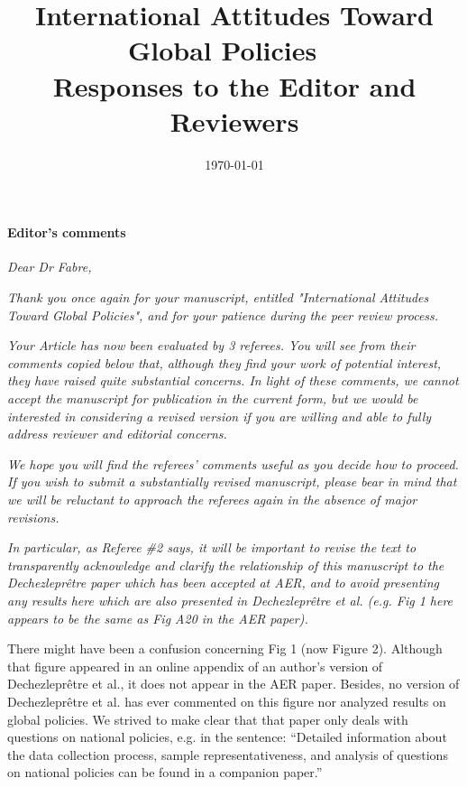 \documentclass[12pt,english]{article}
\title{International Attitudes Toward Global Policies ~\\ \textbf{Responses to the Editor and Reviewers}}
\date{\today}
\begin{document}
	
\maketitle

\paragraph*{Editor's comments}

\textit{Dear Dr Fabre,}

\textit{Thank you once again for your manuscript, entitled "International Attitudes Toward Global Policies", and for your patience during the peer review process.}

\textit{Your Article has now been evaluated by 3 referees. You will see from their comments copied below that, although they find your work of potential interest, they have raised quite substantial concerns. In light of these comments, we cannot accept the manuscript for publication in the current form, but we would be interested in considering a revised version if you are willing and able to fully address reviewer and editorial concerns.}

\textit{We hope you will find the referees' comments useful as you decide how to proceed. If you wish to submit a substantially revised manuscript, please bear in mind that we will be reluctant to approach the referees again in the absence of major revisions.}

\textit{In particular, as Referee \#2 says, it will be important to revise the text to transparently acknowledge and clarify the relationship of this manuscript to the Dechezleprêtre paper which has been accepted at AER, and to avoid presenting any results here which are also presented in Dechezleprêtre et al. (e.g. Fig 1 here appears to be the same as Fig A20 in the AER paper).}

There might have been a confusion concerning Fig 1 (now Figure 2). Although that figure appeared in an online appendix of an author's version of Dechezleprêtre et al., it does not appear in the AER paper. Besides, no version of Dechezleprêtre et al. has ever commented on this figure nor analyzed results on global policies. We strived to make clear that that paper only deals with questions on national policies, e.g. in the sentence: ``Detailed information about the data collection process, sample representativeness, and analysis of questions on national policies can be found in a companion paper.''
~\\
\end{document}
